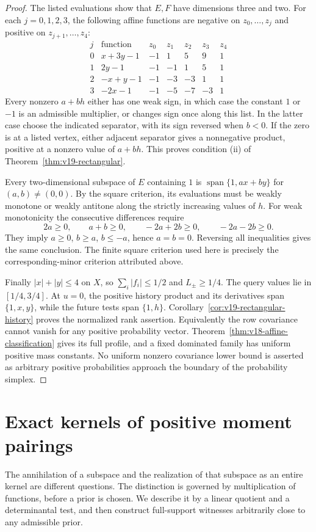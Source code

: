 \documentclass[11pt]{amsart}
\theoremstyle{definition}\newtheorem{definition}[theorem]{Definition}
\theoremstyle{remark}\newtheorem{remark}[theorem]{Remark}
\begin{document}
\begin{proof}
The listed evaluations show that $E,F$ have dimensions three and two.
For each $j=0,1,2,3$, the following affine functions are negative on
$z_0,\ldots,z_j$ and positive on $z_{j+1},\ldots,z_4$:
\[
 \begin{array}{c|c|rrrrr}
 j&\text{function}&z_0&z_1&z_2&z_3&z_4\\\hline
 0&x+3y-1&-1&1&5&9&1\\
 1&2y-1&-1&-1&1&5&1\\
 2&-x+y-1&-1&-3&-3&1&1\\
 3&-2x-1&-1&-5&-7&-3&1
 \end{array}
\]
Every nonzero $a+bh$ either has one weak sign, in which case the
constant $1$ or $-1$ is an admissible multiplier, or changes sign once
along this list. In the latter case choose the indicated separator,
with its sign reversed when $b<0$. If the zero is at a listed vertex,
either adjacent separator gives a nonnegative product, positive at a
nonzero value of $a+bh$. This proves condition (ii) of
Theorem~\ref{thm:v19-rectangular}.

Every two-dimensional subspace of $E$ containing $1$ is
$\operatorname{span}\{1,ax+by\}$ for $(a,b)\ne(0,0)$.
By the square criterion, its evaluations must be weakly monotone or
weakly antitone along the strictly increasing values of $h$.
For weak monotonicity the consecutive differences require
\[
 2a\ge0,\qquad a+b\ge0,\qquad -2a+2b\ge0,
 \qquad -2a-2b\ge0.
\]
They imply $a\ge0$, $b\ge a$, $b\le-a$, hence $a=b=0$.
Reversing all inequalities gives the same conclusion. The finite
square criterion used here is precisely the corresponding-minor
criterion attributed above.

Finally $|x|+|y|\le4$ on $X$, so $\sum_i|f_i|\le1/2$ and
$L_\pm\ge1/4$. The query values lie in $[1/4,3/4]$.
At $u=0$, the positive history product and its derivatives span
$\{1,x,y\}$, while the future tests span $\{1,h\}$.
Corollary~\ref{cor:v19-rectangular-history} proves the normalized
rank assertion. Equivalently the row covariance cannot vanish for
any positive probability vector. Theorem~\ref{thm:v18-affine-classification}
gives its full profile, and a fixed dominated family has uniform
positive mass constants. No uniform nonzero covariance lower bound
is asserted as arbitrary positive probabilities approach the boundary
of the probability simplex.
\end{proof}

\section{Exact kernels of positive moment pairings}
\label{sec:exact-kernels}
The annihilation of a subspace and the realization of that subspace as
an entire kernel are different questions. The distinction is governed
by multiplication of functions, before a prior is chosen. We describe
it by a linear quotient and a determinantal test, and then construct
full-support witnesses arbitrarily close to any admissible prior.
\end{document}
